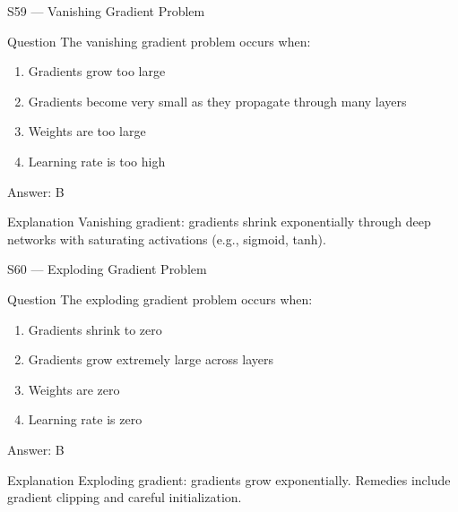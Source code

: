 \documentclass[aspectratio=169,8pt]{beamer}
\begin{document}
	\begin{frame}{S59 --- Vanishing Gradient Problem}
		\begin{block}{Question}
			The vanishing gradient problem occurs when:
			\begin{enumerate}
				\item Gradients grow too large
				\item Gradients become very small as they propagate through many layers
				\item Weights are too large
				\item Learning rate is too high
			\end{enumerate}
		\end{block}
		\begin{exampleblock}{Answer: B}\end{exampleblock}
		\begin{block}{Explanation}
			Vanishing gradient: gradients shrink exponentially through deep networks with saturating activations (e.g., sigmoid, tanh).
		\end{block}
	\end{frame}
	
	\begin{frame}{S60 --- Exploding Gradient Problem}
		\begin{block}{Question}
			The exploding gradient problem occurs when:
			\begin{enumerate}
				\item Gradients shrink to zero
				\item Gradients grow extremely large across layers
				\item Weights are zero
				\item Learning rate is zero
			\end{enumerate}
		\end{block}
		\begin{exampleblock}{Answer: B}\end{exampleblock}
		\begin{block}{Explanation}
			Exploding gradient: gradients grow exponentially. Remedies include gradient clipping and careful initialization.
		\end{block}
	\end{frame}
	
\end{document}
